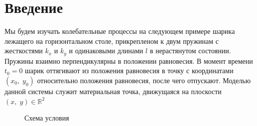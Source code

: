 \documentclass[a4paper,12pt,titlepage]{article}
\theoremstyle{definition}
\theoremstyle{theorem}
\theoremstyle{definition}
\begin{document}
\section{Введение}
Мы будем изучать колебательные процессы на следующем примере шарика 
 лежащего на горизонтальном столе, прикрепленом к двум пружинам с
жесткостями $k_x$ и $k_y$ и одинаковыми длинами $l$ в нерастянутом состоянии. 
Пружины взаимно
перпендикулярны в положении равновесия. В момент времени $t_0 = 0$ шарик оттягивают из
положения равновесия в точку с координатами $(x_0,\; y_0)$ 
относительно положения равновесия,
после чего отпускают. Моделью данной системы служит материальная точка, движущаяся 
на плоскости $(x,\; y) \in \mathbb{R}^2$ \\
\begin{figure}[h!!!]
    \noindent{}
    \caption{Схема условия}
    \label{usl}
\end{figure}
\newpage
\end{document}
